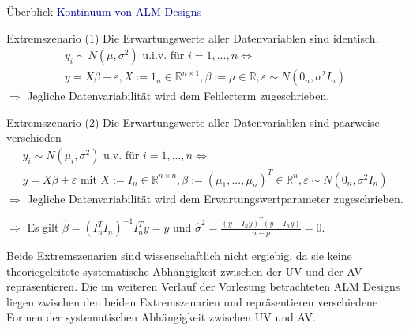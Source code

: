 \documentclass[
  8pt,
  ignorenonframetext,
]{beamer}
\begin{document}
\begin{frame}{Überblick}
\protect\hypertarget{uxfcberblick}{}
\textcolor{darkblue}{Kontinuum von ALM Designs}

\small

Extremszenario (1) Die Erwartungswerte aller Datenvariablen sind
identisch. \begin{multline}
y_i \sim N(\mu,\sigma^2) \mbox{ u.i.v. für } i = 1,...,n  \Leftrightarrow \\
y = X\beta + \varepsilon,  X := 1_n \in \mathbb{R}^{n\times 1}, \beta := \mu \in \mathbb{R}, \varepsilon \sim N(0_n,\sigma^2 I_n)
\end{multline} \(\Rightarrow\) Jegliche Datenvariabilität wird dem
Fehlerterm zugeschrieben. \vspace{2mm}

Extremszenario (2) Die Erwartungswerte aller Datenvariablen sind
paarweise verschieden \begin{multline}
y_i \sim N(\mu_i,\sigma^2) \mbox{ u.v. für } i = 1,...,n \Leftrightarrow \\
y = X\beta + \varepsilon \mbox{ mit } X := I_n \in \mathbb{R}^{n \times n}, \beta := (\mu_1,..., \mu_n)^T \in \mathbb{R}^n, \varepsilon \sim N(0_n,\sigma^2 I_n)
\end{multline} \(\Rightarrow\) Jegliche Datenvariabilität wird dem
Erwartungswertparameter zugeschrieben.

\(\Rightarrow\) Es gilt \(\hat{\beta} = (I_n^TI_n)^{-1}I_n^Ty = y\) und
\(\hat{\sigma}^2 = \frac{(y - I_ny)^T(y - I_ny)}{n-p} = 0\).
\vspace{2mm}

Beide Extremszenarien sind wissenschaftlich nicht ergiebig, da sie keine
theoriegeleitete systematische Abhängigkeit zwischen der UV und der AV
repräsentieren. Die im weiteren Verlauf der Vorlesung betrachteten ALM
Designs liegen zwischen den beiden Extremszenarien und repräsentieren
verschiedene Formen der systematischen Abhängigkeit zwischen UV und AV.
\end{frame}
\end{document}
